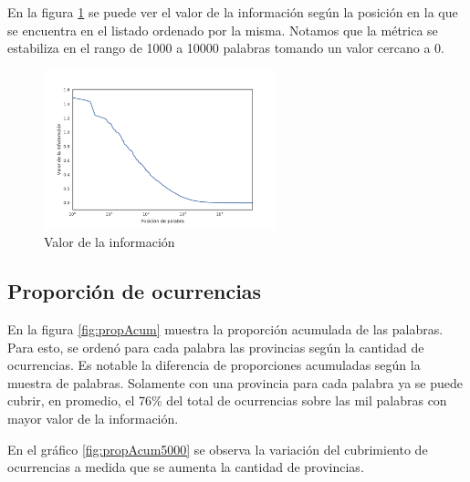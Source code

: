 En la figura \ref{fig:ivalue} se puede ver el valor de la información según la posición en la que se encuentra en el listado ordenado por la misma. Notamos que la métrica se estabiliza en el rango de 1000 a 10000 palabras tomando un valor cercano a 0.


\begin{figure}[ht]
\centering
\includegraphics[width=0.6\textwidth]{./images/ivaluesLog.pdf}
\caption{Valor de la información} 
\label{fig:ivalue}
\end{figure}


\subsection{Proporción de ocurrencias} %
\label{sub:proporcionDeOcurrencias}


En la figura \ref{fig:propAcum} muestra la proporción acumulada de las palabras. Para esto, se ordenó para cada palabra las provincias según la cantidad de ocurrencias. Es notable la diferencia de proporciones acumuladas según la muestra de palabras. Solamente con una provincia para cada palabra ya se puede cubrir, en promedio, el 76\% del total de ocurrencias sobre las mil palabras con mayor valor de la información.

En el gráfico \ref{fig:propAcum5000} se observa la variación del cubrimiento de ocurrencias a medida que se aumenta la cantidad de provincias. 



